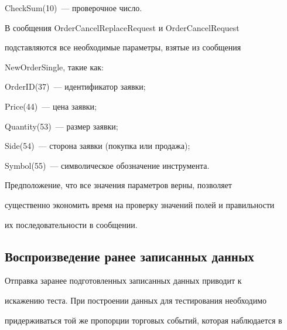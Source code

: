 {\sf CheckSum}(10)~--- проверочное число.





  В сообщения {\sf OrderCancelReplaceRequest} и {\sf OrderCancelRequest}


подставляются все необходимые параметры, взятые из сообщения


{\sf NewOrderSingle}, такие как:





{\sf OrderID}(37)~--- идентификатор заявки;





{\sf Price}(44)~--- цена заявки;





{\sf Quantity}(53)~--- размер заявки;





{\sf Side}(54)~--- сторона заявки (покупка или продажа);





{\sf Symbol}(55)~--- символическое обозначение инструмента.





  Предположение, что все значения параметров верны, позволяет


существенно экономить время на проверку значений полей и правильности


их последовательности в сообщении.





\vspace*{-6pt}





\subsection{Воспроизведение ранее записанных данных}





  Отправка заранее подготовленных записанных данных приводит к


искажению теста. При построении данных для тестирования необходимо


придерживаться той же пропорции торговых событий, которая наблюдается в


